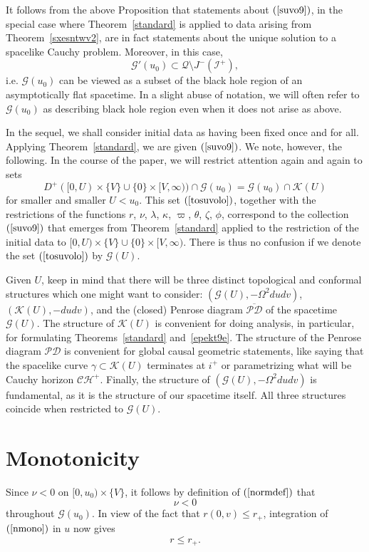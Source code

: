 \documentclass{article}
\begin{document}
It follows from the above Proposition that statements
about $(\ref{suvo9})$, in the special case where Theorem~\ref{standard} 
is applied to
data arising from Theorem~\ref{sxesntwv2}, 
are in fact statements about the unique solution 
to a spacelike Cauchy problem.
Moreover, in this case, 
\[
\mathcal{G}'(u_0)\subset \mathcal{Q}\setminus J^-(\mathcal{I}^+),
\]
i.e. $\mathcal{G}(u_0)$ can be viewed as a subset of the black hole
region of an asymptotically flat spacetime. In a slight abuse
of notation, we will often refer to $\mathcal{G}(u_0)$ as describing 
black hole region even when it does not arise as above.

In the sequel, 
we shall consider initial data as having been fixed once and for all.
Applying Theorem~\ref{standard}, we 
are given $(\ref{suvo9})$.
We note, however, the following. In the course of the paper, we will restrict
attention again and again
to sets
\begin{equation}
\label{tosuvolo}
D^+([0,U)\times\{V\}\cup\{0\}\times[V,\infty))\cap\mathcal{G}(u_0)
=\mathcal{G}(u_0)\cap\mathcal{K}(U)
\end{equation}
for smaller and smaller $U<u_0$.
This set $(\ref{tosuvolo})$, 
together with the restrictions of the functions $r$, $\nu$, $\lambda$,
$\kappa$, $\varpi$, $\theta$, $\zeta$, $\phi$, correspond
to the collection $(\ref{suvo9})$ that emerges 
from Theorem~\ref{standard} applied to the restriction of
the initial data to $[0,U)\times\{V\}\cup\{0\}\times[V,\infty)$.
There is thus no confusion if we denote the set $(\ref{tosuvolo})$ by
$\mathcal{G}(U)$.   

Given $U$, keep in mind that there will be
three distinct topological and
conformal structures which one might want to consider:
$(\mathcal{G}(U),-\Omega^2du dv)$, $(\mathcal{K}(U),-dudv)$, 
and the (closed) Penrose diagram $\overline{\mathcal{PD}}$ 
of the spacetime $\mathcal{G}(U)$.
The structure of $\mathcal{K}(U)$ is convenient for 
doing analysis, in particular, for
formulating Theorems~\ref{standard} and~\ref{epekt9e}.
The structure of the Penrose diagram 
$\mathcal{PD}$ is convenient for global causal geometric statements,
like saying that the spacelike 
curve $\gamma\subset\mathcal{K}(U)$ terminates at $i^+$ or parametrizing
what will be Cauchy horizon $\mathcal{CH}^+$.
Finally, the structure of $(\mathcal{G}(U),-\Omega^2dudv)$
is fundamental, as it is the structure of our spacetime itself. 
All three structures
coincide when restricted to $\mathcal{G}(U)$. 


\section{Monotonicity}
\label{monsec}
Since $\nu<0$ on $[0,u_0)\times\{V\}$, it follows by definition 
of $(\ref{normdef})$ that 
\begin{equation}
\label{nmono}
\nu<0
\end{equation}
throughout $\mathcal{G}(u_0)$. 
In view of the fact that $r(0,v)\le r_+$, integration of $(\ref{nmono})$
in $u$ now gives
\begin{equation}
\label{*IKI*}
r\le r_+.
\end{equation}
\end{document}
